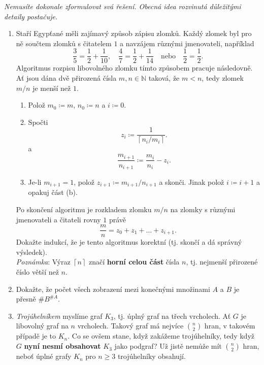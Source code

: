 \documentclass[a4paper,11pt]{article}
\newcommand{\N}{\mathbb{N}}
\begin{document}
 \begin{tcolorbox}[breakable,title=\textsf{Těžké úlohy a důkazy (15
  bodů)},arc=0mm,boxsep=3mm,bottomrule=1pt,toprule=1pt,leftrule=-0.1mm,
  rightrule=-0.1mm,colframe=BrickRed!80!white,colback=BrickRed!5!white]
  \emph{Nemusíte dokonale zformulovat svá řešení. Obecná idea rozvinutá
  důležitými detaily postačuje.}
  \begin{enumerate}
   \item Staří Egypťané měli zajímavý způsob zápisu zlomků. Každý zlomek byl pro
    ně součtem zlomků s čitatelem $1$ a navzájem různými jmenovateli, například
    \[
     \frac{3}{5} = \frac{1}{2} + \frac{1}{10}, \quad \frac{4}{7} = \frac{1}{2} +
     \frac{1}{14} \quad \text{nebo} \quad \frac{1}{2} = \frac{1}{2}.
    \]
    Algoritmus rozpisu libovolného zlomku tímto způsobem pracuje následovně. Ať
    jsou dána dvě přirozená čísla $m,n \in \N$ taková, že $m < n$, tedy zlomek
    $m / n$ je menší než $1$.
    \begin{enumerate}[topsep=0pt]
     \item Polož $m_0 \coloneqq m$, $n_0 \coloneqq n$ a $i \coloneqq 0$.
     \item Spočti
      \[
       z_i \coloneqq \frac{1}{\left\lceil n_i/m_i \right\rceil}.
      \]
      a
      \[
       \frac{m_{i+1}}{n_{i+1}} \coloneqq \frac{m_i}{n_i} - z_i.
      \]
     \item Je-li $m_{i+1}= 1$, polož $z_{i+1} \coloneqq m_{i+1} / n_{i+1}$ a
      skonči. Jinak polož $i \coloneqq i + 1$ a opakuj část (b).
    \end{enumerate}
    Po skončení algoritmu je rozkladem zlomku $m / n$ na
    zlomky s různými jmenovateli a čitateli rovny $1$ právě
    \[
     \frac{m}{n} = z_0 + z_1 + \ldots + z_{i+1}.
    \]
    Dokažte indukcí, že je tento algoritmus korektní (tj. skončí a dá správný
    výsledek).\\
    \emph{Poznámka}: Výraz $\left\lceil n \right\rceil$ značí \textbf{horní
    celou část} čísla $n$, tj. nejmenší přirozené číslo větší než $n$.
   \item Dokažte, že počet všech zobrazení mezi konečnými množinami $A$ a $B$ je
    přesně $\# B^{\# A}$.
   \item \emph{Trojúhelníkem} myslíme graf $K_3$, tj. úplný graf na třech
    vrcholech. Ať $G$ je libovolný graf na $n$ vrcholech. Takový graf má nejvíce
    $\binom{n}{2}$ hran, v takovém případě je to $K_n$. Co se ovšem stane, když
    zakážeme trojúhelníky, tedy když $G$ \textbf{nyní nesmí obsahovat} $K_3$
    jako podgraf? Už jistě nemůže mít $\binom{n}{2}$ hran, neboť úplné grafy
    $K_n$ pro $n \geq 3$ trojúhelníky obsahují.


\end{enumerate}
\end{tcolorbox}
\end{document}
